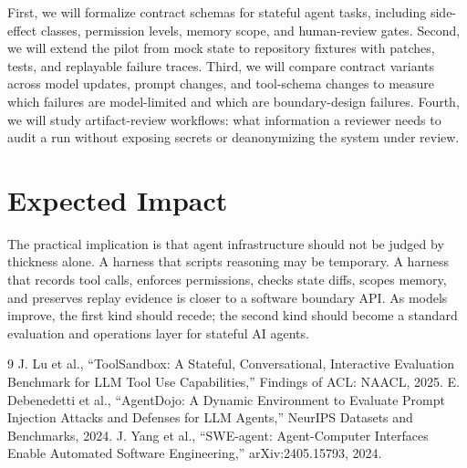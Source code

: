 \documentclass[10pt,conference]{IEEEtran}
\begin{document}
First, we will formalize contract schemas for stateful agent tasks, including
side-effect classes, permission levels, memory scope, and human-review gates.
Second, we will extend the pilot from mock state to repository fixtures with
patches, tests, and replayable failure traces. Third, we will compare contract
variants across model updates, prompt changes, and tool-schema changes to
measure which failures are model-limited and which are boundary-design
failures. Fourth, we will study artifact-review workflows: what information a
reviewer needs to audit a run without exposing secrets or deanonymizing the
system under review.

\section{Expected Impact}

The practical implication is that agent infrastructure should not be judged by
thickness alone. A harness that scripts reasoning may be temporary. A harness
that records tool calls, enforces permissions, checks state diffs, scopes
memory, and preserves replay evidence is closer to a software boundary API. As
models improve, the first kind should recede; the second kind should become a
standard evaluation and operations layer for stateful AI agents.

\begin{thebibliography}{9}
 J. Lu et al., ``ToolSandbox: A Stateful, Conversational,
Interactive Evaluation Benchmark for LLM Tool Use Capabilities,'' Findings of
ACL: NAACL, 2025.
 E. Debenedetti et al., ``AgentDojo: A Dynamic Environment
to Evaluate Prompt Injection Attacks and Defenses for LLM Agents,'' NeurIPS
Datasets and Benchmarks, 2024.
 J. Yang et al., ``SWE-agent: Agent-Computer Interfaces
Enable Automated Software Engineering,'' arXiv:2405.15793, 2024.
\end{thebibliography}
\end{document}
